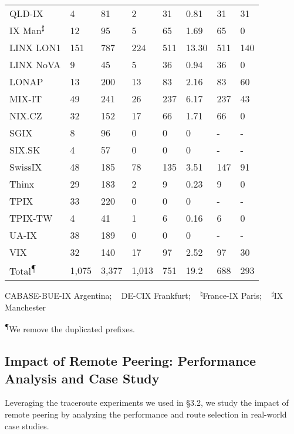 \begin{table}[t]
\begin{center}
\begin{threeparttable}
\begin{tabular}{| p{1.2cm} p{0.6cm} p{0.6cm} p{0.7cm} | p{0.6cm} p{0.6cm} | p{0.6cm} p{0.6cm} |}
QLD-IX  & 4 & 81 & 2 & 31 & 0.81 &31 & 31 \\
IX Man{\textsuperscript{$\sharp$}} & 12 & 95 & 5 & 65 & 1.69 & 65 & 0 \\
LINX LON1 & 151 & 787 & 224  & 511 & 13.30 & 511 & 140 \\
LINX NoVA & 9 & 45 & 5 & 36 & 0.94 & 36 & 0 \\
LONAP & 13 & 200& 13 & 83 & 2.16 & 83 & 60\\
MIX-IT  & 49 & 241 & 26& 237 & 6.17 & 237 & 43 \\
NIX.CZ & 32 & 152 & 17 & 66 & 1.71 & 66 & 0 \\
SGIX& 8 & 96 & 0 & 0 & 0 & -& -\\
SIX.SK & 4 & 57 & 0 & 0 & 0 &-& -\\
SwissIX  & 48 & 185 & 78 & 135 & 3.51 & 147 & 91 \\
Thinx  & 29 & 183 & 2 & 9 & 0.23 & 9 & 0 \\
TPIX & 33 & 220 &0 & 0 & 0 & -& -\\
TPIX-TW & 4 & 41 & 1 & 6 & 0.16 & 6 & 0 \\ 
UA-IX  & 38 & 189 & 0 & 0 & 0 & -& -\\
VIX & 32 & 140 &  17 &  97 & 2.52 & 97 & 30\\
\hline
Total\textsuperscript{\P}  & 1,075 & 3,377 & 1,013 &  751 & 19.2 & 688 & 293 \\
\hline
\end{tabular}
\begin{tablenotes}
{\SMALL
      \item {{\textsuperscript{\dag}CABASE-BUE-IX Argentina; \ } {\textsuperscript{\ddag}DE-CIX Frankfurt; \ } {\textsuperscript{$\natural$}France-IX Paris; \ } {\textsuperscript{$\sharp$}IX Manchester}}
      \item {\textsuperscript{\P}We remove the duplicated prefixes.}}
\end{tablenotes}
\end{threeparttable}
\end{center}
\end{table}

\subsection{Impact of Remote Peering: Performance Analysis and Case Study}
Leveraging the traceroute experiments we used in \S3.2, we study the impact of remote peering by analyzing the performance and route selection in real-world case studies.

